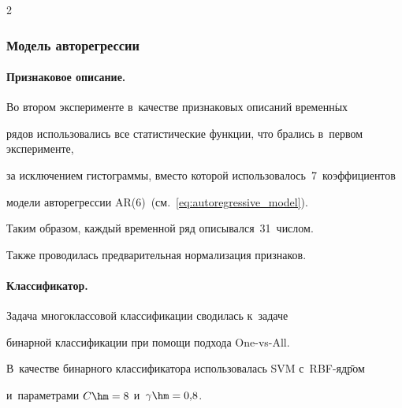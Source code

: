 \begin{multicols}{2}








\subsubsection{Модель авторегрессии} %





\paragraph*{Признаковое описание.}




Во втором эксперименте в~качестве признаковых описаний временн$\acute{\mbox{ы}}$х 


рядов использовались все статистические функции, что брались в~первом эксперименте, 


за исключением гистограммы, вместо которой использовалось~7~коэффициентов 


модели авторегрессии AR($6$)~(см.~\eqref{eq:autoregressive_model}).


Таким образом, каждый временной ряд описывался~31~числом.


Также проводилась предварительная нормализация признаков.





\vspace*{-6pt}





\paragraph*{Классификатор.}


Задача многоклассовой классификации сводилась к~задаче 


бинарной классификации при помощи подхода One-vs-All.


В~качестве бинарного классификатора использовалась SVM с~RBF-яд\=ром 


и~параметрами $C\hm=8$ и~$\gamma\hm=0{,}8$.





\vspace*{-6pt}






\end{multicols}
